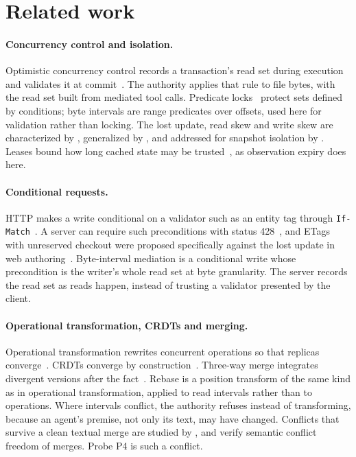 \documentclass[10pt]{article}
\newcommand{\code}[1]{\texttt{#1}}
\begin{document}
\section{Related work}\label{sec:related}

\paragraph{Concurrency control and isolation.}
Optimistic concurrency control records a transaction's read set during execution and validates it at commit~\citep{kung1981optimistic}. The authority applies that rule to file bytes, with the read set built from mediated tool calls. Predicate locks~\citep{eswaran1976notions} protect sets defined by conditions; byte intervals are range predicates over offsets, used here for validation rather than locking. The lost update, read skew and write skew are characterized by \citet{berenson1995critique}, generalized by \citet{adya1999weak}, and addressed for snapshot isolation by \citet{fekete2005making}. Leases bound how long cached state may be trusted~\citep{gray1989leases}, as observation expiry does here.

\paragraph{Conditional requests.}
HTTP makes a write conditional on a validator such as an entity tag through \code{If-Match}~\citep{rfc9110}. A server can require such preconditions with status 428~\citep{rfc6585}, and ETags with unreserved checkout were proposed specifically against the lost update in web authoring~\citep{w3c1999lostupdate}. Byte-interval mediation is a conditional write whose precondition is the writer's whole read set at byte granularity. The server records the read set as reads happen, instead of trusting a validator presented by the client.

\paragraph{Operational transformation, CRDTs and merging.}
Operational transformation rewrites concurrent operations so that replicas converge~\citep{ellis1989concurrency,sun1998achieving}. CRDTs converge by construction~\citep{shapiro2011crdt,kleppmann2017json}. Three-way merge integrates divergent versions after the fact~\citep{khanna2007diff3,mens2002merging}. Rebase is a position transform of the same kind as in operational transformation, applied to read intervals rather than to operations. Where intervals conflict, the authority refuses instead of transforming, because an agent's premise, not only its text, may have changed. Conflicts that survive a clean textual merge are studied by \citet{brun2011proactive}, and \citet{sousa2018verified} verify semantic conflict freedom of merges. Probe P4 is such a conflict.
\end{document}

